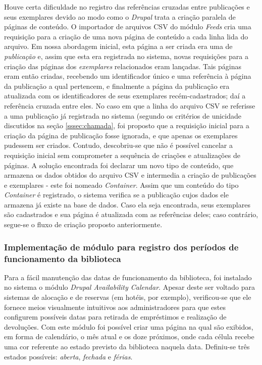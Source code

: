 \documentclass[a4paper]{article}
\begin{document}
Houve certa dificuldade no registro das referências cruzadas entre publicações e seus exemplares devido ao modo como o \textit{Drupal} trata a criação paralela de páginas de conteúdo. O importador de arquivos CSV do módulo \textit{Feeds} cria uma requisição para a criação de uma nova página de conteúdo a cada linha lida do arquivo. Em nossa abordagem inicial, esta página a ser criada era uma de \textit{publicação} e, assim que esta era registrada no sistema, novas requisições para a criação das páginas dos \textit{exemplares} relacionados eram lançadas. Tais páginas eram então criadas, recebendo um identificador único e uma referência à página da publicação a qual pertencem, e finalmente a página da publicação era atualizada com os identificadores de seus exemplares recém-cadastrados; daí a referência cruzada entre eles. No caso em que a linha do arquivo CSV se referisse a uma publicação já registrada no sistema (segundo os critérios de unicidade discutidos na seção \ref{sssec:chamada}, foi proposto que a requisição inicial para a criação da página de publicação fosse ignorada, e que apenas os exemplares pudessem ser criados. Contudo, descobriu-se que não é possível cancelar a requisição inicial sem comprometer a sequência de criações e atualizações de páginas. A solução encontrada foi declarar um novo tipo de conteúdo, que armazena os dados obtidos do arquivo CSV e intermedia a criação de publicações e exemplares - este foi nomeado \textit{Container}. Assim que um conteúdo do tipo \textit{Container} é registrado, o sistema verifica se a publicação cujos dados ele armazena já existe na base de dados. Caso ela seja encontrada, seus exemplares são cadastrados e sua página é atualizada com as referências deles; caso contrário, segue-se o fluxo de criação proposto anteriormente.

\subsubsection{Implementação de módulo para registro dos períodos de funcionamento da biblioteca}
Para a fácil manutenção das datas de funcionamento da biblioteca, foi instalado no sistema o módulo \textit{Drupal Availability Calendar}. Apesar deste ser voltado para sistemas de alocação e de reservas (em hotéis, por exemplo), verificou-se que ele fornece meios visualmente intuitivos aos administradores para que estes configurem possíveis datas para retirada de empréstimos e realização de devoluções. Com este módulo foi possível criar uma página na qual são exibidos, em forma de calendário, o mês atual e os doze próximos, onde cada célula recebe uma cor referente ao estado previsto da biblioteca naquela data. Definiu-se três estados possíveis: \textit{aberta}, \textit{fechada} e \textit{férias}.
\end{document}
